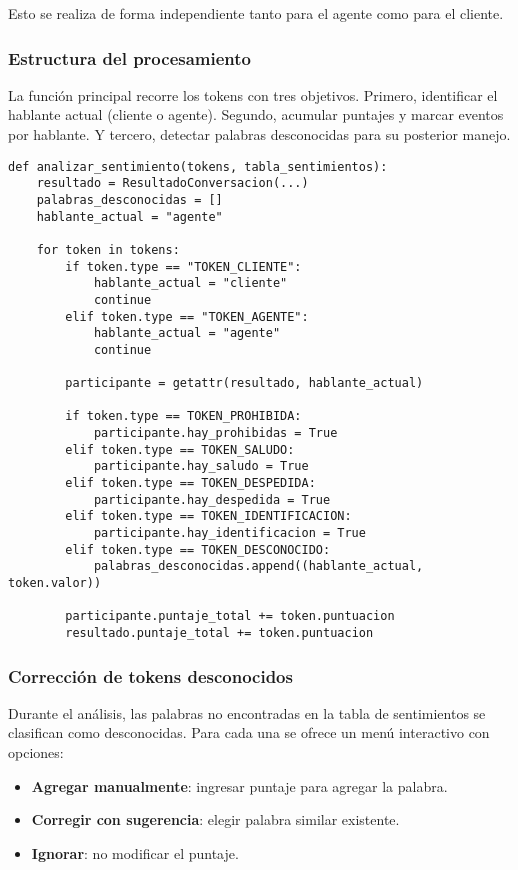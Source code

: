 Esto se realiza de forma independiente tanto para el agente como para el cliente.

\subsubsection{Estructura del procesamiento}
La función principal recorre los tokens con tres objetivos. Primero, identificar el hablante
actual (cliente o agente). Segundo, acumular puntajes y marcar eventos por hablante. Y tercero,
detectar palabras desconocidas para su posterior manejo.

\begin{verbatim}
def analizar_sentimiento(tokens, tabla_sentimientos):
    resultado = ResultadoConversacion(...)
    palabras_desconocidas = []
    hablante_actual = "agente"

    for token in tokens:
        if token.type == "TOKEN_CLIENTE":
            hablante_actual = "cliente"
            continue
        elif token.type == "TOKEN_AGENTE":
            hablante_actual = "agente"
            continue

        participante = getattr(resultado, hablante_actual)

        if token.type == TOKEN_PROHIBIDA:
            participante.hay_prohibidas = True
        elif token.type == TOKEN_SALUDO:
            participante.hay_saludo = True
        elif token.type == TOKEN_DESPEDIDA:
            participante.hay_despedida = True
        elif token.type == TOKEN_IDENTIFICACION:
            participante.hay_identificacion = True
        elif token.type == TOKEN_DESCONOCIDO:
            palabras_desconocidas.append((hablante_actual, token.valor))

        participante.puntaje_total += token.puntuacion
        resultado.puntaje_total += token.puntuacion
\end{verbatim}

\subsubsection{Corrección de tokens desconocidos}
Durante el análisis, las palabras no encontradas en la tabla de sentimientos se clasifican como
desconocidas. Para cada una se ofrece un menú interactivo con opciones:

\begin{itemize}
	\item \textbf{Agregar manualmente}: ingresar puntaje para agregar la palabra.
	\item \textbf{Corregir con sugerencia}: elegir palabra similar existente.
	\item \textbf{Ignorar}: no modificar el puntaje.
\end{itemize}

